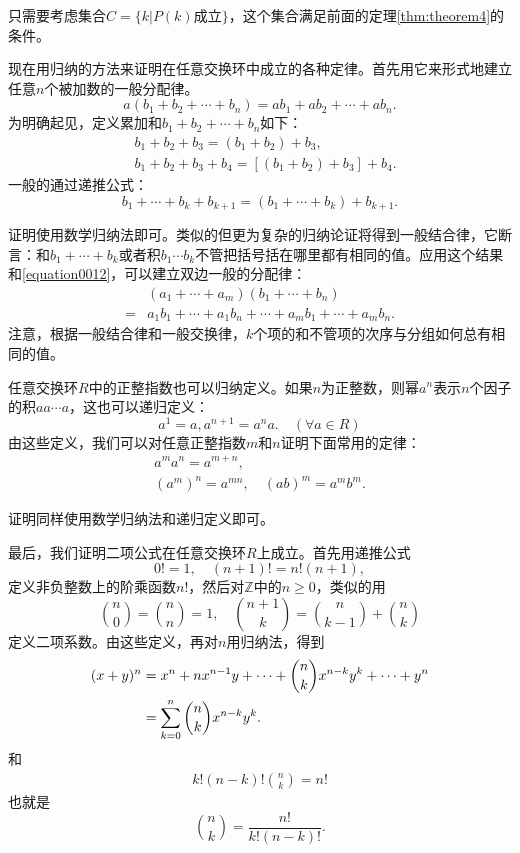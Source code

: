 只需要考虑集合$C = \{k|P(k)\text{成立}\}$，这个集合满足前面的定理\ref{thm:theorem4}的条件。

现在用归纳的方法来证明在任意交换环中成立的各种定律。首先用它来形式地建立任意$n$个被加数的一般分配律。
\begin{equation}\label{equation0012}
a(b_1+b_2+\cdots+b_n) = ab_1+ab_2+\cdots+ab_n.
\end{equation}
为明确起见，定义累加和$b_1+b_2+\cdots+b_n$如下：
\[
\begin{aligned}
&b_1+b_2+b_3 = (b_1+b_2)+b_3,\\
&b_1+b_2+b_3+b_4 = [(b_1+b_2)+b_3]+b_4.
\end{aligned}
\]
一般的通过递推公式：
\begin{equation}\label{equation0013}
b_1+\cdots+b_k+b_{k+1} = (b_1+\cdots+b_k) + b_{k+1}.
\end{equation}

证明使用数学归纳法即可。类似的但更为复杂的归纳论证将得到一般结合律，它断言：和$b_1+\cdots+b_k$或者积$b_1\cdots{}b_k$不管把括号括在哪里都有相同的值。应用这个结果和\ref{equation0012}，可以建立双边一般的分配律：
\[
\begin{aligned}
&(a_1+\cdots+a_m)(b_1+\cdots+b_n)\\
=&a_1b_1+\cdots+a_1b_n+\cdots+a_mb_1+\cdots+a_mb_n.
\end{aligned}
\]
注意，根据一般结合律和一般交换律，$k$个项的和不管项的次序与分组如何总有相同的值。

任意交换环$R$中的正整指数也可以归纳定义。如果$n$为正整数，则幂$a^n$表示$n$个因子的积$aa\cdots{}a$，这也可以递归定义：
\begin{equation}\label{equation0016}
a^1 = a, a^{n+1} = a^na. \quad(\forall a \in R)
\end{equation}由这些定义，我们可以对任意正整指数$m$和$n$证明下面常用的定律：
\begin{gather}
a^ma^n=a^{m+n},\label{equation0017}\\
(a^m)^n = a^{mn},\quad (ab)^m=a^mb^m.\label{equation0018}
\end{gather}

证明同样使用数学归纳法和递归定义即可。

最后，我们证明二项公式在任意交换环$R$上成立。首先用递推公式
\[
0!=1,\quad (n+1)!=n!(n+1),
\]
定义非负整数上的阶乘函数$n!$，然后对$\mathbb{Z}$中的$n \ge 0$，类似的用
\[
\binom{n}{0} = \binom{n}{n}=1, \quad \binom{n+1}{k} = \binom{n}{k-1} + \binom{n}{k} 
\]
定义二项系数。由这些定义，再对$n$用归纳法，得到 %
\begin{align}\label{equation0019}
(x+y)^n &= x^n + nx^{n-1}y + \cdots + \binom{n}{k}x^{n-k}y^k + \cdots + y^n \notag \\
&=\sum_{k=0}^{n}{\binom{n}{k}x^{n-k}y^k}.
\end{align}
和
\begin{gather}\label{equation0020}
k!(n-k)!\binom{n}{k}=n!
\end{gather}
也就是
\[
{n \choose k} = \frac{n!}{k!(n-k)!}.
\]

